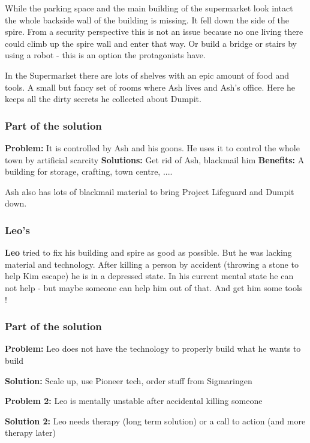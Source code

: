 While the parking space and the main building of the supermarket look intact the whole backside wall of the building is missing. It fell down the side of the spire. From a security perspective this is not an issue because no one living there could climb up the spire wall and enter that way. Or build a bridge or stairs by using a robot - this is an option the protagonists have.

In the Supermarket there are lots of shelves with an epic amount of food and tools. A small but fancy set of rooms where Ash lives and Ash's office. Here he keeps all the dirty secrets he collected about Dumpit.

\subsubsection{Part of the solution}

\textbf{Problem:} It is controlled by Ash and his goons. He uses it to control the whole town by artificial scarcity
\textbf{Solutions:} Get rid of Ash, blackmail him
\textbf{Benefits:} A building for storage, crafting, town centre, ....

Ash also has lots of blackmail material to bring Project Lifeguard and Dumpit down.

\subsubsection{Leo's}

\textbf{Leo} tried to fix his building and spire as good as possible. But he was lacking material and technology. After killing a person by accident (throwing a stone to help Kim escape) he is in a depressed state. In his current mental state he can not help - but maybe someone can help him out of that. And get him some tools !

\subsubsection{Part of the solution}

\textbf{Problem:} Leo does not have the technology to properly build what he wants to build

\textbf{Solution:} Scale up, use Pioneer tech, order stuff from Sigmaringen

\textbf{Problem 2:} Leo is mentally unstable after accidental killing someone

\textbf{Solution 2:} Leo needs therapy (long term solution) or a call to action (and more therapy later)

